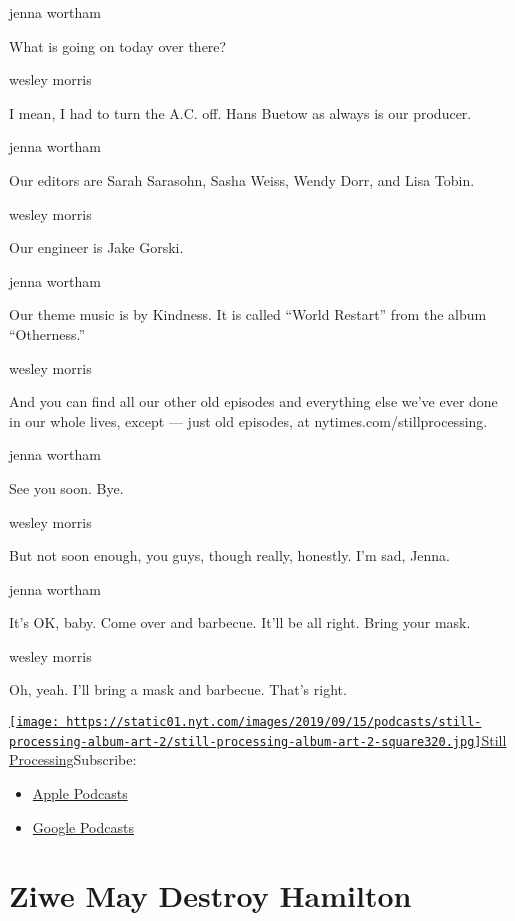 jenna wortham

What is going on today over there?

wesley morris

I mean, I had to turn the A.C. off. Hans Buetow as always is our
producer.

jenna wortham

Our editors are Sarah Sarasohn, Sasha Weiss, Wendy Dorr, and Lisa Tobin.

wesley morris

Our engineer is Jake Gorski.

jenna wortham

Our theme music is by Kindness. It is called ``World Restart'' from the
album ``Otherness.''

wesley morris

And you can find all our other old episodes and everything else we've
ever done in our whole lives, except --- just old episodes, at
nytimes.com/stillprocessing.

jenna wortham

See you soon. Bye.

wesley morris

But not soon enough, you guys, though really, honestly. I'm sad, Jenna.

jenna wortham

It's OK, baby. Come over and barbecue. It'll be all right. Bring your
mask.

wesley morris

Oh, yeah. I'll bring a mask and barbecue. That's right.

\href{https://www.nytimes.com/column/still-processing-podcast}{\texttt{[image: https://static01.nyt.com/images/2019/09/15/podcasts/still-processing-album-art-2/still-processing-album-art-2-square320.jpg]}Still
Processing}Subscribe:

\begin{itemize}
\tightlist
\item
  \href{https://itunes.apple.com/us/podcast/id1151436460}{Apple
  Podcasts}
\item
  \href{https://www.google.com/podcasts?feed=aHR0cHM6Ly9yc3MuYXJ0MTkuY29tL255dC1zdGlsbC1wcm9jZXNzaW5n}{Google
  Podcasts}
\end{itemize}

\hypertarget{ziwe-may-destroy-hamilton-1}{%
\section{Ziwe May Destroy Hamilton}\label{ziwe-may-destroy-hamilton-1}}


